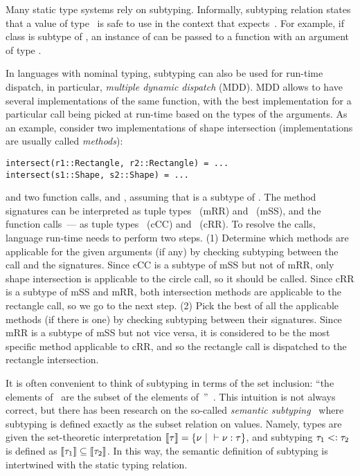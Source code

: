 Many static type systems rely on subtyping.
Informally, subtyping relation  states that
a value of type~ is safe to use 
in the context that expects~.
For example, if class  is subtype of ,
an instance of  can be passed to a function
with an argument of type .

In languages with nominal typing, subtyping can also be used for run-time
dispatch, in particular, \emph{multiple dynamic dispatch} (MDD).
MDD allows to have several implementations of the same function,
with the best implementation for a particular call being picked 
at run-time based on the types of the arguments.
As an example, consider two implementations of shape intersection
(implementations are usually called \emph{methods}):
\begin{verbatim}
intersect(r1::Rectangle, r2::Rectangle) = ...
intersect(s1::Shape, s2::Shape) = ...
\end{verbatim}
and two function calls, 
and ,
assuming that  is a subtype of .
The method signatures can be interpreted as tuple types
~(mRR) 
and ~(mSS),
and the function calls~--- as tuple types 
~(cCC) 
and ~(cRR).
To resolve the calls, language run-time needs to perform two steps.
(1) Determine which methods are applicable for the given arguments (if any)
by checking subtyping between the call and the signatures.
Since cCC is a subtype of mSS but not of mRR, only shape intersection
is applicable to the circle call, so it should be called.
Since cRR is a subtype of mSS and mRR, both intersection methods 
are applicable to the rectangle call, so we go to the next step.
(2) Pick the best of all the applicable methods (if there is one) 
by checking subtyping between their signatures.
Since mRR is a subtype of mSS but not vice versa, it is considered to be
the most specific method applicable to cRR, 
and so the rectangle call is dispatched to the rectangle intersection.

It is often convenient to think of subtyping 
in terms of the set inclusion: ``the elements of~ are the subset
of the elements of~''~\cite{TAPL}.
This intuition is not always correct, but there has been research on
the so-called \emph{semantic subtyping}~\cite{?} where subtyping is defined
exactly as the subset relation on values.
Namely, types are given the set-theoretic interpretation
$\llbracket \tau \rrbracket = \{\nu ~\vert~ \vdash \nu : \tau \}$, 
and subtyping $\tau_1 <: \tau_2$ is defined 
as $\llbracket \tau_1 \rrbracket \subseteq \llbracket \tau_2 \rrbracket$.
In this way, the semantic definition of subtyping is intertwined with 
the static typing relation.

